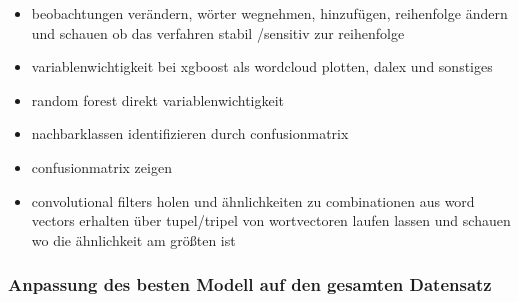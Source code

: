 \documentclass[a4paper,11pt]{article}
\begin{document}
\begin{itemize}

    \item beobachtungen verändern, wörter wegnehmen, hinzufügen, reihenfolge ändern und schauen ob das verfahren stabil /sensitiv zur reihenfolge
    \item variablenwichtigkeit bei xgboost als wordcloud plotten, dalex und sonstiges
    \item random forest direkt variablenwichtigkeit
    \item nachbarklassen identifizieren durch confusionmatrix
    \item confusionmatrix zeigen
    \item convolutional filters holen und ähnlichkeiten zu combinationen aus word vectors erhalten über tupel/tripel von wortvectoren laufen lassen und schauen wo die ähnlichkeit am größten ist
\end{itemize}{}

\subsubsection{Anpassung des besten Modell auf den gesamten Datensatz}
\end{document}

